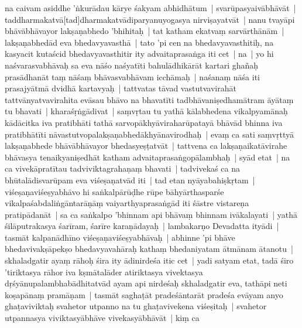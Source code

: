\documentclass[article,12pt,a4paper]{memoir}
\begin{document}
na caivam asiddhe 'ṅkurādau kārye śakyam abhidhātum | svarūpasyaivābhāvāt | taddharmakatvā[tad]dharmakatvādiparyanuyogasya nirviṣayatvāt | \label{thakur75-123.13} nanu tvayāpi bhāvābhāvayor lakṣaṇabhedo 'bhihitaḥ | tat katham ekatvaṃ sarvārthānām | lakṣaṇabhedād eva bhedavyavasthā | tato 'pi cen na bhedavyavasthitiḥ, na kasyacit kutaścid bhedavyavasthitir ity advaitaprasaṅga iti cet | \label{thakur75-123.15} na | yo hi naśvarasvabhāvaḥ sa eva nāśo naśyatīti bahulādhikārāt kartari ghañaḥ prasādhanāt taṃ nāśaṃ bhāvasvabhāvam icchāmaḥ | naśanaṃ nāśa iti prasajyātmā dvidhā kartavyaḥ | tattvatas tāvad vastutvavirahāt tattvānyatvavirahita evāsau bhāvo na bhavatīti tadbhāvaniṣedhamātram āyātaṃ tu bhavati | kharaśṛṅgādivat | saṃvṛtau tu yathā kālabhedena vikalpyamānaḥ kādācitka iva pratibhāti tathā sarvopākhyāviraharūpatayā bhāvād bhinna iva pratibhātīti nāvastutvopalakṣaṇabhedākhyānavirodhaḥ | evaṃ ca sati saṃvṛttyā lakṣaṇabhede bhāvābhāvayor bhedasyeṣṭatvāt | tattvena ca lakṣaṇaikatāvirahe bhāvasya tenaikyaniṣedhāt katham advaitaprasaṅgopālambhaḥ | \label{thakur75-123.24} syād etat | na ca vivekāpratītau tadviviktagrahaṇaṃ bhavati | tadvivekaś ca na bhūtalādisvarūpam eva viśeṣaṇatvād iti | \label{thakur75-123.25} tad etan nyāyabahiṣkṛtam | viśeṣaṇaviśeṣyabhāvo hi saṅkalpārūḍhe rūpe bāhyārthasparśe vikalpaśabdaliṅgāntarāṇāṃ vaiyarthyaprasaṅgād iti śāstre vistareṇa pratipādanāt | sa ca saṅkalpo 'bhinnam api bhāvaṃ bhinnam ivākalayati | yathā śilāputrakasya śarīram, śarīre karaṇādayaḥ | lambakarṇo Devadatta ityādi | tasmāt kalpanādhīno viśeṣaṇaviśeṣyabhāvaḥ | abhinne 'pi bhāve bhedavivakṣāpekṣo bhedavyavahāraḥ kathaṃ bhedaniyatam ātmānam ātanotu | \label{thakur75-123.31} skhaladgatir ayaṃ rāhoḥ śira ity ādinirdeśa itic cet | \label{thakur75-123.31a} yadi satyam etat, tadā śiro 'tiriktasya rāhor iva kṣmātalāder atiriktasya vivektasya dṛśyānupalambhabādhitatvād ayam api nirdeśaḥ skhaladgatir eva, tathāpi neti koṣapānaṃ pramāṇam | tasmāt saghaṭāt pradeśāntarāt pradeśa evāyam anyo ghaṭaviviktaḥ svahetor utpanno na tu ghaṭavivekena viśeṣitaḥ | svahetor utpannasya viviktasyābhāve vivekasyābhāvāt | \label{thakur75-124.3} kiṃ ca
	\pend
      
\end{document}
